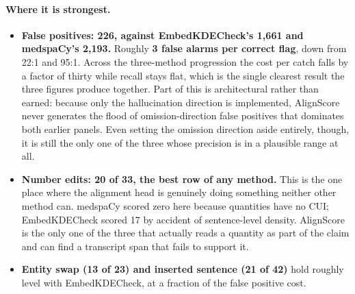 \paragraph{Where it is strongest.}
\begin{itemize}
    \item \textbf{False positives: 226, against EmbedKDECheck's 1{,}661 and
          medspaCy's 2{,}193.} Roughly \textbf{3 false alarms per correct flag},
          down from 22:1 and 95:1. Across the three-method progression the cost per
          catch falls by a factor of thirty while recall stays flat, which is the
          single clearest result the three figures produce together. Part of this
          is architectural rather than earned: because only the hallucination
          direction is implemented, AlignScore never generates the flood of
          omission-direction false positives that dominates both earlier panels.
          Even setting the omission direction aside entirely, though, it is still
          the only one of the three whose precision is in a plausible range at all.
    \item \textbf{Number edits: 20 of 33, the best row of any method.} This is the
          one place where the alignment head is genuinely doing something neither
          other method can. medspaCy scored zero here because quantities have no
          CUI; EmbedKDECheck scored 17 by accident of sentence-level density.
          AlignScore is the only one of the three that actually reads a quantity as
          part of the claim and can find a transcript span that fails to support it.
    \item \textbf{Entity swap (13 of 23) and inserted sentence (21 of 42)} hold
          roughly level with EmbedKDECheck, at a fraction of the false positive
          cost.
\end{itemize}

